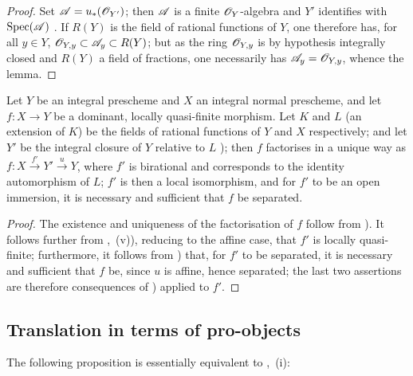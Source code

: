 \begin{proof}
Set $\mathscr{A}=u_*(\mathscr{O}_{Y'})$; then $\mathscr{A}$ is a finite $\mathscr{O}_Y$-algebra and $Y'$ identifies with $\operatorname{Spec}(\mathscr{A})$ .
If $R(Y)$ is the field of rational functions of $Y$, one therefore has, for all $y\in Y$, $\mathscr{O}_{Y,y}\subset\mathscr{A}_y\subset R(Y)$; but as the ring $\mathscr{O}_{Y,y}$ is by hypothesis integrally closed and $R(Y)$ a field of fractions, one necessarily has $\mathscr{A}_y=\mathscr{O}_{Y,y}$, whence the lemma.
\end{proof}

\begin{corollary}[8.12.11]
\label{IV.8.12.11}
Let $Y$ be an integral prescheme and $X$ an integral normal prescheme, and let $f:X\to Y$ be a dominant, locally quasi-finite morphism.
Let $K$ and $L$ (an extension of $K$) be the fields of rational functions of $Y$ and $X$ respectively; and let $Y'$ be the integral closure of $Y$ relative to $L$ ); then $f$ factorises in a unique way as $f:X\xrightarrow{f'}Y'\xrightarrow{u}Y$, where $f'$ is birational and corresponds to the identity automorphism of $L$; $f'$ is then a local isomorphism, and for $f'$ to be an open immersion, it is necessary and sufficient that $f$ be separated.
\end{corollary}

\begin{proof}
The existence and uniqueness of the factorisation of $f$ follow from ).
It follows further from ,~(v)), reducing to the affine case, that $f'$ is locally quasi-finite; furthermore, it follows from ) that, for $f'$ to be separated, it is necessary and sufficient that $f$ be, since $u$ is affine, hence separated; the last two assertions are therefore consequences of ) applied to $f'$.
\end{proof}


\subsection{Translation in terms of pro-objects}
\label{subsection:IV.8.13}

The following proposition is essentially equivalent to ,~(i):

